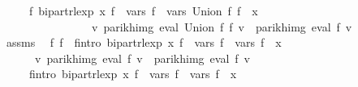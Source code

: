 \begin{isabellebody}
\ \ \ \ \ {\isachardoublequoteopen}{\isasymexists}f{\isacharprime}{\kern0pt}{\isachardot}{\kern0pt}\ bipart{\isacharunderscore}{\kern0pt}rlexp\ x\ f{\isacharprime}{\kern0pt}\ {\isasymand}\ vars\ f{\isacharprime}{\kern0pt}\ {\isacharequal}{\kern0pt}\ vars\ {\isacharparenleft}{\kern0pt}Union\ f{}\ f{}{\isacharparenright}{\kern0pt}\ {\isasymunion}\ {\isacharbraceleft}{\kern0pt}x{\isacharbraceright}{\kern0pt}\ {\isasymand}\isanewline
\ \ \ \ \ \ \ \ \ \ \ \ \ \ \ \ {\isacharparenleft}{\kern0pt}{\isasymforall}v{\isachardot}{\kern0pt}\ parikh{\isacharunderscore}{\kern0pt}img\ {\isacharparenleft}{\kern0pt}eval\ {\isacharparenleft}{\kern0pt}Union\ f{}\ f{}{\isacharparenright}{\kern0pt}\ v{\isacharparenright}{\kern0pt}\ {\isacharequal}{\kern0pt}\ parikh{\isacharunderscore}{\kern0pt}img\ {\isacharparenleft}{\kern0pt}eval\ f{\isacharprime}{\kern0pt}\ v{\isacharparenright}{\kern0pt}{\isacharparenright}{\kern0pt}{\isachardoublequoteclose}\isanewline
%
\isadelimproof
%
\endisadelimproof
%
\isatagproof
{}\isamarkupfalse%
\ {\isacharminus}{\kern0pt}\isanewline
\ \ \isamarkupfalse%
\ assms\ \isamarkupfalse%
\ f{}{\isacharprime}{\kern0pt}\ f{}{\isacharprime}{\kern0pt}\ \ f{}{\isacharprime}{\kern0pt}{\isacharunderscore}{\kern0pt}intro{\isacharcolon}{\kern0pt}\ {\isachardoublequoteopen}bipart{\isacharunderscore}{\kern0pt}rlexp\ x\ f{}{\isacharprime}{\kern0pt}\ {\isasymand}\ vars\ f{}{\isacharprime}{\kern0pt}\ {\isacharequal}{\kern0pt}\ vars\ f{}\ {\isasymunion}\ {\isacharbraceleft}{\kern0pt}x{\isacharbraceright}{\kern0pt}\ {\isasymand}\isanewline
\ \ \ \ \ \ {\isacharparenleft}{\kern0pt}{\isasymforall}v{\isachardot}{\kern0pt}\ parikh{\isacharunderscore}{\kern0pt}img\ {\isacharparenleft}{\kern0pt}eval\ f{}\ v{\isacharparenright}{\kern0pt}\ {\isacharequal}{\kern0pt}\ parikh{\isacharunderscore}{\kern0pt}img\ {\isacharparenleft}{\kern0pt}eval\ f{}{\isacharprime}{\kern0pt}\ v{\isacharparenright}{\kern0pt}{\isacharparenright}{\kern0pt}{\isachardoublequoteclose}\isanewline
\ \ \ \ \ f{}{\isacharprime}{\kern0pt}{\isacharunderscore}{\kern0pt}intro{\isacharcolon}{\kern0pt}\ {\isachardoublequoteopen}bipart{\isacharunderscore}{\kern0pt}rlexp\ x\ f{}{\isacharprime}{\kern0pt}\ {\isasymand}\ vars\ f{}{\isacharprime}{\kern0pt}\ {\isacharequal}{\kern0pt}\ vars\ f{}\ {\isasymunion}\ {\isacharbraceleft}{\kern0pt}x{\isacharbraceright}{\kern0pt}\ {\isasymand}\isanewline

\end{isabellebody}
